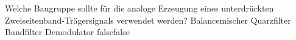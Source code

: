     {Welche Baugruppe sollte für die analoge Erzeugung eines unterdrückten Zweiseitenband-Trägersignals verwendet werden?}
    {Balancemischer}
    {Quarzfilter}
    {Bandfilter}
    {Demodulator}
    {false}{false}